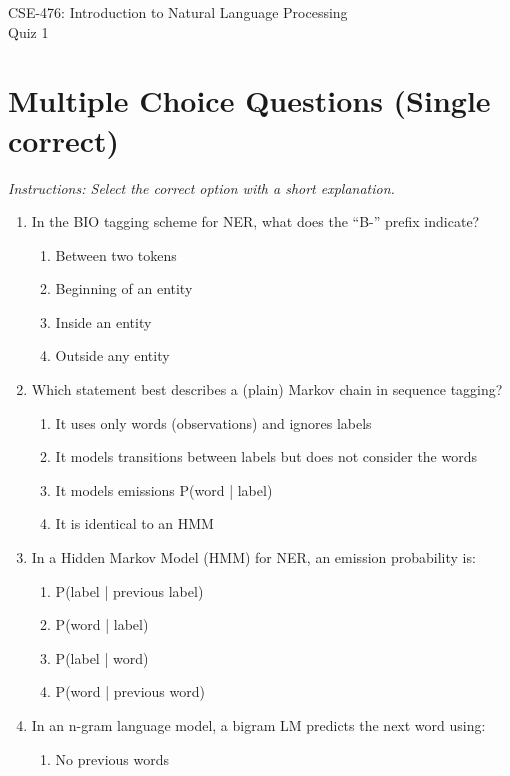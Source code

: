 \documentclass[12pt]{article}
\begin{document}
\begin{center}
CSE-476: Introduction to Natural Language Processing \\
Quiz 1 \\
\end{center}

\section*{Multiple Choice Questions (Single correct)}
\textit{Instructions: Select the correct option with a short explanation.}
\begin{enumerate}[label=Q\arabic*.]
\item In the BIO tagging scheme for NER, what does the ``B-'' prefix indicate?
\begin{enumerate}[label=(\Alph*)]
    \item Between two tokens
    \item Beginning of an entity
    \item Inside an entity
    \item Outside any entity
\end{enumerate}
\item Which statement best describes a (plain) Markov chain in sequence tagging?
\begin{enumerate}[label=(\Alph*)]
    \item It uses only words (observations) and ignores labels
    \item It models transitions between labels but does not consider the words
    \item It models emissions P(word | label)
    \item It is identical to an HMM
\end{enumerate}
\item In a Hidden Markov Model (HMM) for NER, an emission probability is:
\begin{enumerate}[label=(\Alph*)]
    \item P(label | previous label)
    \item P(word | label)
    \item P(label | word)
    \item P(word | previous word)
\end{enumerate}
\item In an n-gram language model, a bigram LM predicts the next word using:
\begin{enumerate}[label=(\Alph*)]
    \item No previous words

\end{enumerate}
\end{enumerate}
\end{document}
